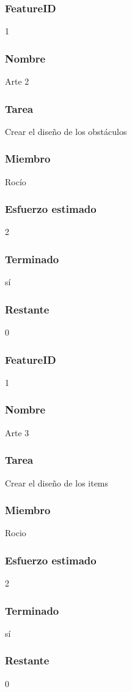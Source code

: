 \subsubsection{FeatureID} 1
\subsubsection{Nombre} Arte 2
\subsubsection{Tarea} Crear el diseño de los obstáculos
\subsubsection{Miembro} Rocío
\subsubsection{Esfuerzo estimado} 2
\subsubsection{Terminado} sí
\subsubsection{Restante} 0


\subsubsection{FeatureID} 1
\subsubsection{Nombre} Arte 3
\subsubsection{Tarea} Crear el diseño de los items
\subsubsection{Miembro} Rocio
\subsubsection{Esfuerzo estimado} 2
\subsubsection{Terminado} sí
\subsubsection{Restante} 0